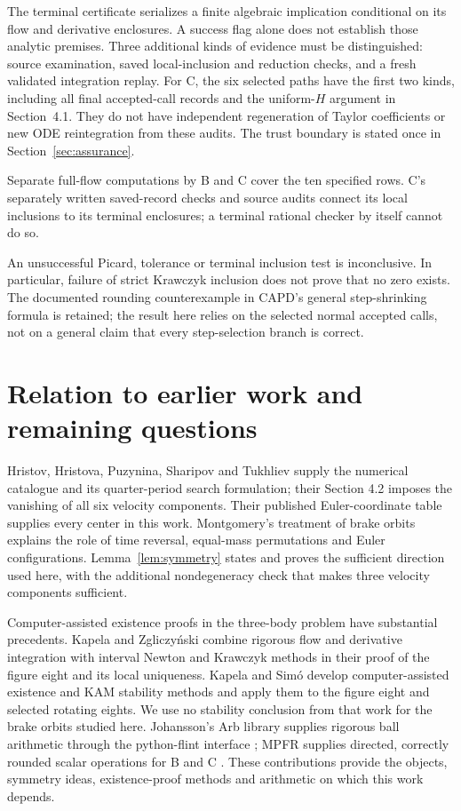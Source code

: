 \documentclass[10pt,a4paper]{article}
\theoremstyle{remark}
\begin{document}
The terminal certificate serializes a finite algebraic implication
conditional on its flow and derivative enclosures. A success flag alone
does not establish those analytic premises. Three additional kinds of
evidence must be distinguished: source examination, saved local-inclusion
and reduction checks, and a fresh validated integration replay. For C,
the six selected paths have the first two kinds, including all final
accepted-call records and the uniform-$H$ argument in Section~4.1.
They do not have independent regeneration of Taylor coefficients or
new ODE reintegration from these audits. The trust boundary is stated
once in Section~\ref{sec:assurance}.

Separate full-flow computations by B and C cover the ten specified
rows. C's separately written saved-record checks and source audits
connect its local inclusions to its terminal enclosures; a terminal
rational checker by itself cannot do so.

An unsuccessful Picard, tolerance or terminal inclusion test is
inconclusive. In particular, failure of strict Krawczyk inclusion
does not prove that no zero exists. The documented rounding
counterexample in CAPD's general step-shrinking formula is retained;
the result here relies on the selected normal accepted calls, not on a
general claim that every step-selection branch is correct.

\section{Relation to earlier work and remaining questions}
\label{sec:prior}
Hristov, Hristova, Puzynina, Sharipov and Tukhliev
\cite{Hristov} supply the numerical catalogue and its quarter-period
search formulation; their Section 4.2 imposes the vanishing of all six
velocity components. Their published Euler-coordinate table
\cite{Data} supplies every center in this work. Montgomery's treatment
of brake orbits \cite[Section 3]{Montgomery} explains the role of time
reversal, equal-mass permutations and Euler configurations.
Lemma~\ref{lem:symmetry} states and proves the sufficient direction
used here, with the additional nondegeneracy check that makes three
velocity components sufficient.

Computer-assisted existence proofs in the three-body problem have
substantial precedents. Kapela and Zgliczy\'nski
\cite[Sections 2--3]{KapelaZgliczynski} combine rigorous flow and
derivative integration with interval Newton and Krawczyk methods in
their proof of the figure eight and its local uniqueness. Kapela and
Sim\'o \cite{KapelaSimo} develop computer-assisted existence and KAM
stability methods and apply them to the figure eight and selected
rotating eights. We use no stability conclusion from that work for
the brake orbits studied here. Johansson's Arb library
\cite{Johansson} supplies rigorous ball arithmetic through the
python-flint interface \cite{PythonFlint}; MPFR supplies directed,
correctly rounded scalar operations for B and C
\cite{MPFR}. These contributions provide the objects, symmetry ideas,
existence-proof methods and arithmetic on which this work depends.
\end{document}
